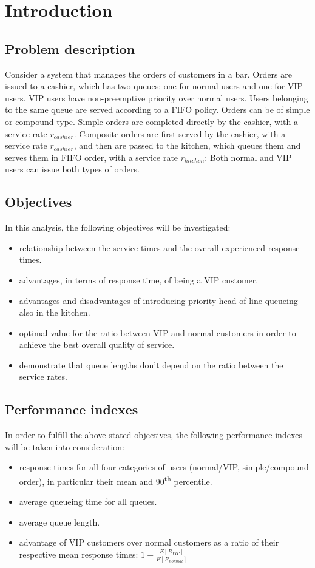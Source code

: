 \section{Introduction}

\subsection{Problem description}
Consider a system that manages the orders of customers in a bar. Orders are issued to a cashier, which
has two queues: one for normal users and one for VIP users. VIP users have non-preemptive priority
over normal users. Users belonging to the same queue are served according to a FIFO policy.
Orders can be of simple or compound type. Simple orders are completed directly by the cashier, with
a service rate $r_{cashier}$. Composite orders are first served by the cashier, with a service rate $r_{cashier}$, and
then are passed to the kitchen, which queues them and serves them in FIFO order, with a service rate
$r_{kitchen}$: Both normal and VIP users can issue both types of orders.

\subsection{Objectives}
In this analysis, the following objectives will be investigated:
\begin{itemize}
    \item relationship between the service times and the overall experienced
        response times. 
    \item advantages, in terms of response time, of being a VIP customer.
    \item advantages and disadvantages of introducing priority head-of-line queueing
        also in the kitchen.
    \item optimal value for the ratio between VIP and normal customers in order to achieve the best overall quality of service.
    \item demonstrate that queue lengths don't depend on the ratio between the service rates.
\end{itemize}

\subsection{Performance indexes}
In order to fulfill the above-stated objectives, the following performance 
indexes will be taken into consideration:
\begin{itemize}
    \item response times for all four categories of users (normal/VIP, 
    simple/compound order), in particular their mean and 90\textsuperscript{th} 
    percentile.
    \item average queueing time for all queues.
    \item average queue length.
    \item advantage of VIP customers over normal customers as a ratio of their respective mean response times: $1-{\frac{E[R_{VIP}]}{E[R_{normal}]}}$
\end{itemize}


